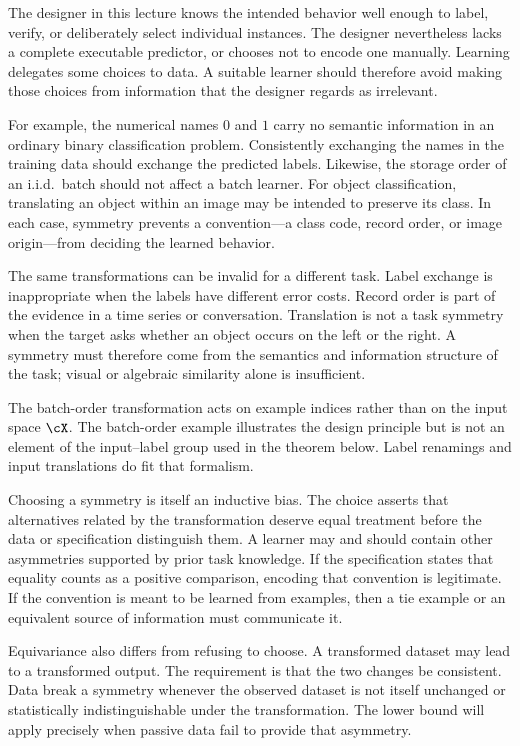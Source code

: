 \documentclass[11pt,twoside]{article}
\theoremstyle{definition}
\theoremstyle{remark}
\begin{document}
The designer in this lecture knows the intended behavior well enough to label,
verify, or deliberately select individual instances. The designer nevertheless
lacks a complete executable predictor, or chooses not to encode one manually.
Learning delegates some choices to data. A suitable learner should therefore
avoid making those choices from information that the designer regards as
irrelevant.

For example, the numerical names \(0\) and \(1\) carry no semantic information
in an ordinary binary classification problem. Consistently exchanging the
names in the training data should exchange the predicted labels. Likewise,
the storage order of an i.i.d.\ batch should not affect a batch learner. For
object classification, translating an object within an image may be intended
to preserve its class. In each case, symmetry prevents a convention---a class
code, record order, or image origin---from deciding the learned behavior.

The same transformations can be invalid for a different task. Label exchange
is inappropriate when the labels have different error costs. Record order is
part of the evidence in a time series or conversation. Translation is not a
task symmetry when the target asks whether an object occurs on the left or the
right. A symmetry must therefore come from the semantics and information
structure of the task; visual or algebraic similarity alone is insufficient.

The batch-order transformation acts on example indices rather than on the
input space \(\cX\). The batch-order example illustrates the design principle
but is not an element of the input--label group used in the theorem below.
Label renamings and input translations do fit that formalism.

Choosing a symmetry is itself an inductive bias. The choice asserts that
alternatives related by the transformation deserve equal treatment before the
data or specification distinguish them. A learner may and should contain
other asymmetries supported by prior task knowledge. If the specification
states that equality counts as a positive comparison, encoding that convention
is legitimate. If the convention is meant to be learned from examples, then a
tie example or an equivalent source of information must communicate it.

Equivariance also differs from refusing to choose. A transformed dataset may
lead to a transformed output. The requirement is that the two changes be
consistent. Data break a symmetry whenever the observed dataset is not itself
unchanged or statistically indistinguishable under the transformation. The
lower bound will apply precisely when passive data fail to provide that
asymmetry.
\end{document}
